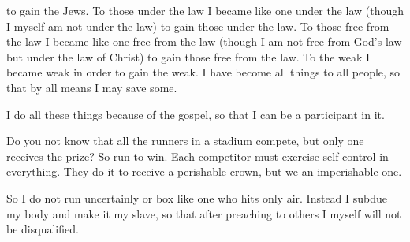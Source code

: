 {to gain
the Jews.
To those under
the law
I became like
one under
the law
(though I myself am not
under
the law) to gain
those under
the law.
To those free from the law
I became like
one free from the law
(though I am not
free from
God’s
law
but
under the law
of Christ) to
gain
those free from the law.
To the weak
I became
weak
in order
to gain
the weak.
I have become
all things
to all people,
so that
by all means
I may save
some.
\par }{\PP {}I do
all these things
because of
the gospel,
so that
I can be
a participant
in it.
\par }{\PP {}Do you
not
know
that
all
the runners in
a stadium
compete,
but
only one
receives
the prize? So
run
to
win.
Each competitor
must exercise
self-control
in everything.
They do it to
receive
a perishable
crown,
but
we
an imperishable one.
\par }{\PP {}So
I
do
not
run
uncertainly
or
box
like
one who hits
only
air.
Instead
I subdue
my
body
and
make it
my slave,
so that
after preaching
to others
I
myself
will
not
be
disqualified.

}
